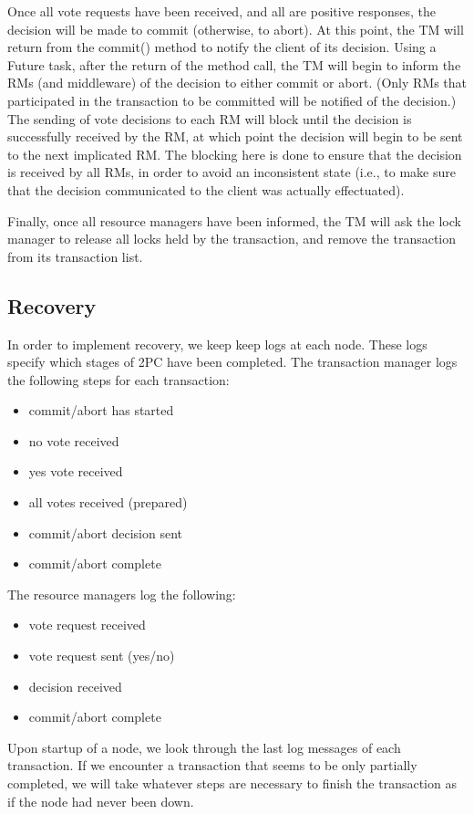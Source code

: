 \documentclass[11pt]{article}
\begin{document}
Once all vote requests have been received, and all are positive responses, the decision will be made to commit (otherwise, to abort). At this point, the TM will return from the commit() method to notify the client of its decision. Using a Future task, after the return of the method call, the TM will begin to inform the RMs (and middleware) of the decision to either commit or abort. (Only RMs that participated in the transaction to be committed will be notified of the decision.) The sending of vote decisions to each RM will block until the decision is successfully received by the RM, at which point the decision will begin to be sent to the next implicated RM. The blocking here is done to ensure that the decision is received by all RMs, in order to avoid an inconsistent state (i.e., to make sure that the decision communicated to the client was actually effectuated).  \par

Finally, once all resource managers have been informed, the TM will ask the lock manager to release all locks held by the transaction, and remove the transaction from its transaction list.  \par

\subsection*{Recovery}

In order to implement recovery, we keep keep logs at each node. These logs specify which stages of 2PC have been completed. The transaction manager logs the following steps for each transaction:
\begin{itemize}
\item commit/abort has started
\item no vote received
\item yes vote received
\item all votes received (prepared)
\item commit/abort decision sent
\item commit/abort complete
\end{itemize}
The resource managers log the following:
\begin{itemize}
\item vote request received
\item vote request sent (yes/no)
\item decision received
\item commit/abort complete
\end{itemize} 
Upon startup of a node, we look through the last log messages of each transaction. If we encounter a transaction that seems to be only partially completed, we will take whatever steps are necessary to finish the transaction as if the node had never been down.\par 
\end{document}
